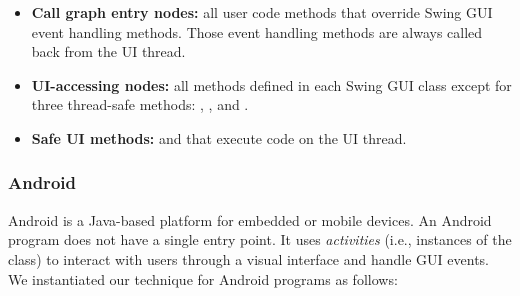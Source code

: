 \begin{myindentpar}{-2mm}
\begin{itemize}
\tinystep

\item \textbf{Call graph entry nodes:} all user code methods that override
Swing GUI event handling methods. Those event handling methods are always
called back from the UI thread.

\tinystep

\item \textbf{UI-accessing nodes:} %
all methods defined in each Swing GUI class except for three thread-safe
methods: , , and .

\tinystep

\item \textbf{Safe UI methods: } 
 and  that execute code on the UI thread.

\end{itemize}
\end{myindentpar}

\smallstep

\tinystep
\subsubsection{Android}

Android is a Java-based platform for embedded or mobile devices. 
An Android program does not have a single entry point.
It uses \textit{activities}
(i.e., instances of the  class)
to interact with users through a visual interface and handle GUI events.
We instantiated our technique for Android programs as follows:


